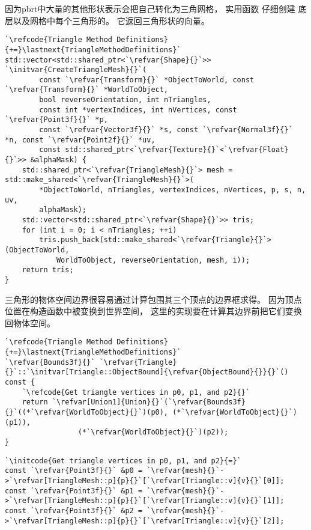 因为pbrt中大量的其他形状表示会把自己转化为三角网格，
实用函数
仔细创建
底层以及网格中每个三角形的。
它返回三角形状的向量。
\begin{lstlisting}
`\refcode{Triangle Method Definitions}{+=}\lastnext{TriangleMethodDefinitions}`
std::vector<std::shared_ptr<`\refvar{Shape}{}`>> `\initvar{CreateTriangleMesh}{}`(
        const `\refvar{Transform}{}` *ObjectToWorld, const `\refvar{Transform}{}` *WorldToObject,
        bool reverseOrientation, int nTriangles,
        const int *vertexIndices, int nVertices, const `\refvar{Point3f}{}` *p,
        const `\refvar{Vector3f}{}` *s, const `\refvar{Normal3f}{}` *n, const `\refvar{Point2f}{}` *uv,
        const std::shared_ptr<`\refvar{Texture}{}`<`\refvar{Float}{}`>> &alphaMask) {
    std::shared_ptr<`\refvar{TriangleMesh}{}`> mesh = std::make_shared<`\refvar{TriangleMesh}{}`>(
        *ObjectToWorld, nTriangles, vertexIndices, nVertices, p, s, n, uv,
        alphaMask);
    std::vector<std::shared_ptr<`\refvar{Shape}{}`>> tris;
    for (int i = 0; i < nTriangles; ++i)
        tris.push_back(std::make_shared<`\refvar{Triangle}{}`>(ObjectToWorld,
            WorldToObject, reverseOrientation, mesh, i));
    return tris;
}
\end{lstlisting}

三角形的物体空间边界很容易通过计算包围其三个顶点的边界框求得。
因为顶点位置在构造函数中被变换到世界空间，
这里的实现要在计算其边界前把它们变换回物体空间。
\begin{lstlisting}
`\refcode{Triangle Method Definitions}{+=}\lastnext{TriangleMethodDefinitions}`
`\refvar{Bounds3f}{}` `\refvar{Triangle}{}`::`\initvar[Triangle::ObjectBound]{\refvar{ObjectBound}{}}{}`() const {
    `\refcode{Get triangle vertices in p0, p1, and p2}{}`
    return `\refvar[Union1]{Union}{}`(`\refvar{Bounds3f}{}`((*`\refvar{WorldToObject}{}`)(p0), (*`\refvar{WorldToObject}{}`)(p1)),
                 (*`\refvar{WorldToObject}{}`)(p2));
}
\end{lstlisting}
\begin{lstlisting}
`\initcode{Get triangle vertices in p0, p1, and p2}{=}`
const `\refvar{Point3f}{}` &p0 = `\refvar{mesh}{}`->`\refvar[TriangleMesh::p]{p}{}`[`\refvar[Triangle::v]{v}{}`[0]];
const `\refvar{Point3f}{}` &p1 = `\refvar{mesh}{}`->`\refvar[TriangleMesh::p]{p}{}`[`\refvar[Triangle::v]{v}{}`[1]];
const `\refvar{Point3f}{}` &p2 = `\refvar{mesh}{}`->`\refvar[TriangleMesh::p]{p}{}`[`\refvar[Triangle::v]{v}{}`[2]];
\end{lstlisting}

